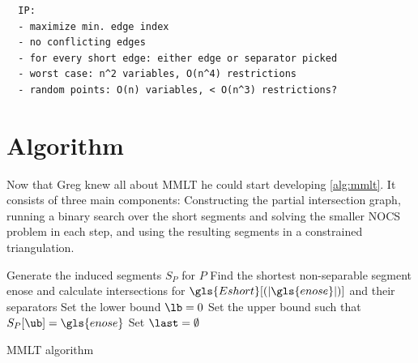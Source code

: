 \begin{verbatim}
  IP:
  - maximize min. edge index
  - no conflicting edges
  - for every short edge: either edge or separator picked
  - worst case: n^2 variables, O(n^4) restrictions
  - random points: O(n) variables, < O(n^3) restrictions?
\end{verbatim}


\section{Algorithm}
Now that Greg knew all about \gls{MMLT} he could start developing
\cref{alg:mmlt}. It consists of three main components: Constructing
the partial intersection graph, running a binary search over the short
segments and solving the smaller \gls{NOCS} problem in each step, and
using the resulting segments in a constrained triangulation.

\begin{algorithm}
  \DontPrintSemicolon
  
  
  Generate the induced segments \(S_P\) for \(P\) \;
  Find the shortest non-separable segment \gls{enose}
  and calculate intersections for 
  \(\gls{Eshort}[(|\gls{enose}|)]\) and their separators \;
  Set the lower bound \(\lb = 0\) \;
  Set the upper bound \ub such that \(S_P[\ub] = \gls{enose}\) \;
  Set \(\last = \emptyset\) \;
  \caption{\label{alg:mmlt}\gls{MMLT} algorithm}
\end{algorithm}
  
